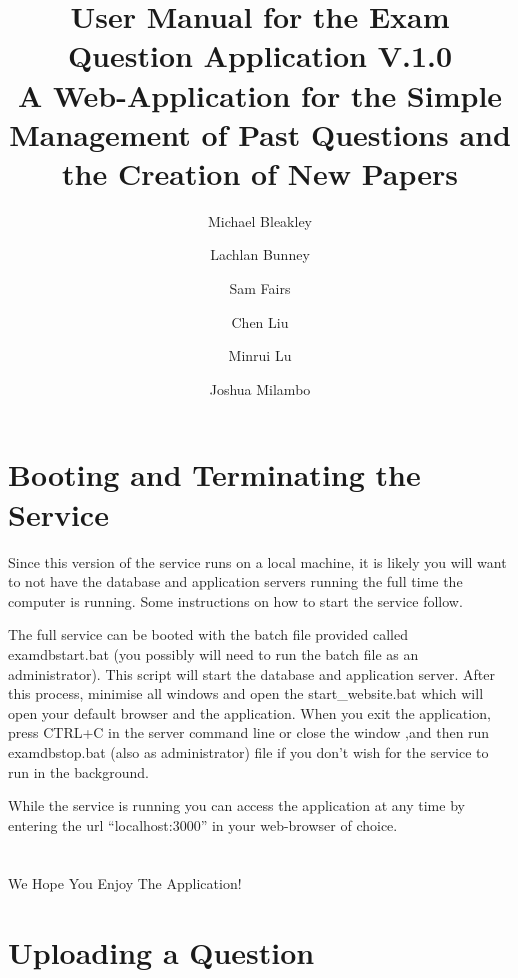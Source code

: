\documentclass[12pt, a4paper, titlepage]{book}
\author{
    Michael Bleakley
  \and
    Lachlan Bunney
    \and
    Sam Fairs
    \and
    Chen Liu
	\and
	Minrui Lu
	\and
	Joshua Milambo
}
\begin{document}
\begin{titlepage}

\title{User Manual for the Exam Question Application V.1.0\\ \normalsize A Web-Application for the Simple Management of Past Questions and the Creation of New Papers}
\maketitle
\end{titlepage}
\tableofcontents
\frontmatter
\small
\chapter{Booting and Terminating the Service}
Since this version of the service runs on a local machine, it is likely you will want to not have the database and application servers running the full time the computer is running. Some instructions on how to start the service follow.

The full service can be booted with the batch file provided called examdbstart.bat (you possibly will need to run the batch file as an administrator). This script will start the database and application server. After this process, minimise all windows and open the start\_website.bat which will open your default browser and the application. When you exit the application, press CTRL+C in the server command line or close the window ,and then run examdbstop.bat (also as administrator) file if you don't wish for the service to run in the background. 

While the service is running you can access the application at any time by entering the url ``localhost:3000'' in your web-browser of choice.
\\\\\\
\large We Hope You Enjoy The Application!

\normalsize
\mainmatter
\chapter{Uploading a Question}
\end{document}
